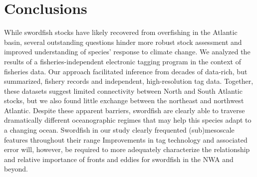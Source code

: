 \section{Conclusions}

While swordfish stocks have likely recovered from overfishing in the Atlantic basin, several outstanding questions hinder more robust stock assessment and improved understanding of species' response to climate change. We analyzed the results of a fisheries-independent electronic tagging program in the context of fisheries data. Our approach facilitated inference from decades of data-rich, but summarized, fishery records and independent, high-resolution tag data. Together, these datasets suggest limited connectivity between North and South Atlantic stocks, but we also found little exchange between the northeast and northwest Atlantic. Despite these apparent barriers, swordfish are clearly able to traverse dramatically different oceanographic regimes that may help this species adapt to a changing ocean. Swordfish in our study clearly frequented (sub)mesoscale features throughout their range Improvements in tag technology and associated error will, however, be required to more adequately characterize the relationship and relative importance of fronts and eddies for swordfish in the NWA and beyond.
